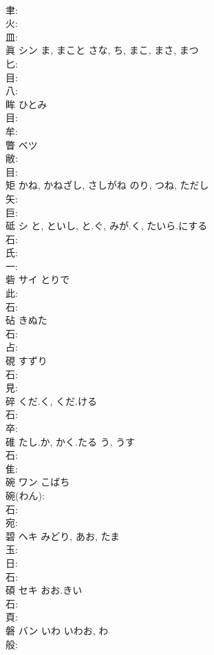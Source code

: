 \documentclass[8pt]{extreport}
\begin{document}
\begin{CJK}{UTF8}{min}
\\	聿: 
\\	火: 
\\	皿: 
\\	眞	シン	ま, まこと	さな, ち, まこ, まさ, まつ	
\\	匕: 
\\	目: 
\\	八: 
\\	眸		ひとみ			
\\	目: 
\\	牟: 
\\	瞥	ベツ			
\\	敝: 
\\	目: 
\\	矩		かね, かねざし, さしがね	のり, つね, ただし		
\\	矢: 
\\	巨: 
\\	砥	シ	と, といし, と.ぐ, みが.く, たいら.にする		
\\	石: 
\\	氏: 
\\	一: 
\\	砦	サイ	とりで		
\\	此: 
\\	石: 
\\	砧		きぬた				
\\	石: 
\\	占: 
\\	硯		すずり			
\\	石: 
\\	見: 
\\	碎		くだ.く, くだ.ける				
\\	石: 
\\	卒: 
\\	碓		たし.か, かく.たる	う, うす		
\\	石: 
\\	隹: 
\\	碗	ワン	こばち		
\\	碗(わん): 
\\	石: 
\\	宛: 
\\	碧	ヘキ		みどり, あお, たま	
\\	玉: 
\\	日: 
\\	石: 
\\	碩	セキ	おお.きい		
\\	石: 
\\	頁: 
\\	磐	バン	いわ	いわお, わ	
\\	般: 

\end{CJK}
\end{document}
